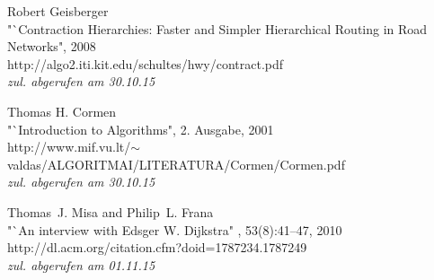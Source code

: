 \documentclass[12pt]{article}
\begin{document}
\begin{thebibliography}{99}
\clearpage

 Robert Geisberger\\
\newblock "`Contraction Hierarchies: Faster and Simpler Hierarchical Routing in Road Networks", 2008\\
\newblock http://algo2.iti.kit.edu/schultes/hwy/contract.pdf \\\emph{zul. abgerufen am 30.10.15}

 Thomas H. Cormen\\
\newblock "`Introduction to Algorithms", 2. Ausgabe, 2001\\
\newblock http://www.mif.vu.lt/$\sim$valdas/ALGORITMAI/LITERATURA/Cormen/Cormen.pdf \\\emph{zul. abgerufen am 30.10.15}

 Thomas~J. Misa and Philip~L. Frana\\
\newblock "`An interview with Edsger W. Dijkstra"
, 53(8):41--47, 2010\\
\newblock http://dl.acm.org/citation.cfm?doid=1787234.1787249 \\\emph{zul. abgerufen am 01.11.15}

\end{thebibliography}
\newpage

%

%


\end{document}
